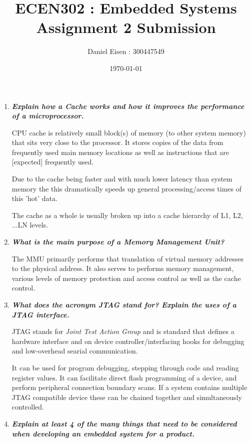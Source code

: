 \documentclass[11pt]{article}
\title{ECEN302 : Embedded Systems \\ Assignment 2 Submission}
\author{Daniel Eisen : 300447549}
\date{\today}
\begin{document}
\begin{preview}
\maketitle
\begin{enumerate}
    \item \textit{\textbf{Explain how a Cache works and how it improves the performance of a microprocessor.}}
    
    CPU cache is relatively small block(s) of memory (to other system memory) that sits very close to the processor. It stores copies of the data from frequently used main memory locations as well as instructions that are [expected] frequently used.

    Due to the cache being faster and with much lower latency than system memory the this dramatically speeds up general processing/access times of this 'hot' data.

    The cache as a whole is usually broken up into a cache hierarchy of L1, L2, ...LN levels.
    
    \item \textit{\textbf{What is the main purpose of a Memory Management Unit?}}
    
    The MMU primarily performs that translation of virtual memory addresses to the physical address. It also serves to performs memory management, various levels of memory protection and access control as well as the cache control.
    
    \item \textit{\textbf{What does the acronym JTAG stand for? Explain the uses of a JTAG interface.}}
    
    JTAG stands for \textit{Joint Test Action Group} and is standard that defines a hardware interface and on device controller/interfacing hooks for debugging and low-overhead searial communication.

    It can be used for program debugging, stepping through code and reading register values. It can facilitate direct flash programming of a device, and perform peripheral connection boundary scans. If a system contains multiple JTAG compatible device these can be chained together and simultaneously controlled.

    \item \textit{\textbf{Explain at least 4 of the many things that need to be considered when developing an embedded system for a product.}}
    

\end{enumerate}
\end{preview}
\end{document}
